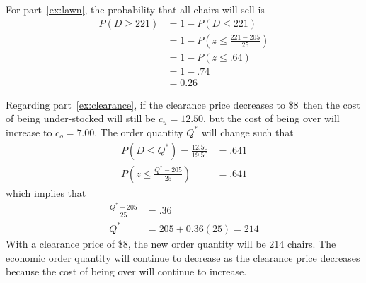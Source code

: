 \begin{enumerate}
\begin{solution}
For part~\ref{ex:lawn}, the probability that all chairs will sell is
\begin{align*}
  P\left(D \geq 221 \right) &= 1 - P\left(D \leq 221 \right)\\
                            &= 1 - P\left( z \leq \frac{221-205}{25} \right) \\
                            &= 1 - P\left( z \leq .64 \right)\\
                            &= 1 - .74 \\
                            &= 0.26
\end{align*}

Regarding part~\ref{ex:clearance}, if the clearance price decreases to
\$8\, then the cost of being under-stocked will still be $c_u=12.50$,
but the cost of being over will increase to $c_o=7.00$. The order
quantity $Q^{\ast}$ will change such that
\begin{align*}
  P\left(D \leq Q^{\ast}\right) = \frac{12.50}{19.50} &= .641 \\
  P\left(z \leq \frac{Q^{\ast}-205}{25}\right) &= .641
\end{align*}
which implies that
\begin{align*}
  \frac{Q^{\ast}- 205}{25} &= .36\\
  Q^{\ast} &= 205 + 0.36(25) = 214
\end{align*}
With a clearance price of \$8, the new order quantity will be 214
chairs.  The economic order quantity will continue to decrease as the
clearance price decreases because the cost of being over will continue
to increase.
\end{solution}

\end{enumerate}
